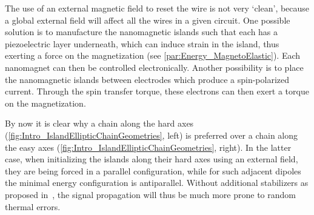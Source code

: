 \documentclass[11pt,a4paper,english]{article}
\begin{document}
\par
The use of an external magnetic field to reset the wire is not very `clean', because a global external field will affect all the wires in a given circuit. One possible solution is to manufacture the nanomagnetic islands such that each has a piezoelectric layer underneath, which can induce strain in the island, thus exerting a force on the magnetization (see \cref{par:Energy_MagnetoElastic}). Each nanomagnet can then be controlled electronically. Another possibility is to place the nanomagnetic islands between electrodes which produce a spin-polarized current. Through the spin transfer torque, these electrons can then exert a torque on the magnetization.~\cite{SwitchingForced_EnergyEfficient,syllabus_PoAEaPD} \par
By now it is clear why a chain along the hard axes (\cref{fig:Intro_IslandEllipticChainGeometries}, left) is preferred over a chain along the easy axes (\cref{fig:Intro_IslandEllipticChainGeometries}, right). In the latter case, when initializing the islands along their hard axes using an external field, they are being forced in a parallel configuration, while for such adjacent dipoles the minimal energy configuration is antiparallel. Without additional stabilizers as proposed in~\cite{NML_Carlton}, the signal propagation will thus be much more prone to random thermal errors.
\end{document}
